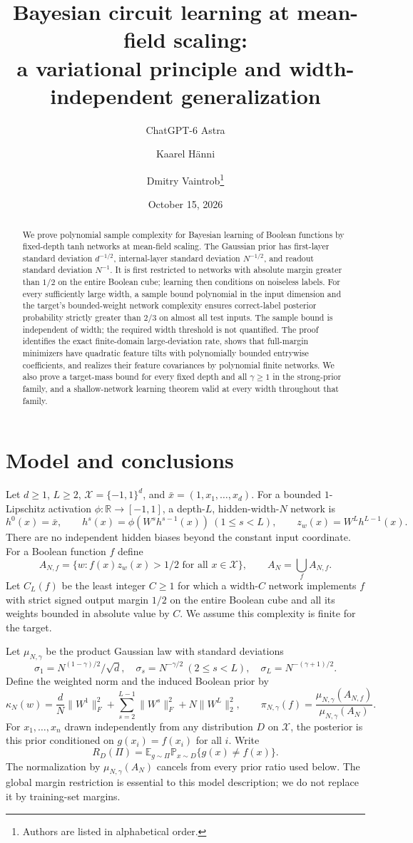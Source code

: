 \documentclass[11pt]{article}
\title{Bayesian circuit learning at mean-field scaling:\\a variational principle and width-independent generalization}
\author{ChatGPT-6 Astra \and Kaarel H\"anni \and Dmitry Vaintrob\thanks{Authors are listed in alphabetical order.}}
\date{October 15, 2026}
\theoremstyle{remark}\newtheorem{remark}[theorem]{Remark}
\newcommand{\E}{\mathbb E}\newcommand{\Prb}{\mathbb P}\newcommand{\R}{\mathbb R}
\begin{document}
\maketitle
\begin{abstract}
We prove polynomial sample complexity for Bayesian learning of Boolean functions
by fixed-depth tanh networks at mean-field scaling. The Gaussian prior has
first-layer standard deviation $d^{-1/2}$, internal-layer standard deviation
$N^{-1/2}$, and readout standard deviation $N^{-1}$. It is first restricted to
networks with absolute margin greater than $1/2$ on the entire Boolean cube;
learning then conditions on noiseless labels. For every sufficiently large
width, a sample bound polynomial in the input dimension and the target's
bounded-weight network complexity ensures correct-label posterior probability
strictly greater than $2/3$ on almost all test inputs. The sample bound is
independent of width; the required width threshold is not quantified.
The proof identifies the exact finite-domain large-deviation rate, shows that
full-margin minimizers have quadratic feature tilts with polynomially bounded
entrywise coefficients, and realizes their feature covariances by polynomial
finite networks. We also prove a target-mass bound for every fixed depth and
all $\gamma\geq1$ in the strong-prior family, and a shallow-network learning
theorem valid at every width throughout that family.
\end{abstract}

\section{Model and conclusions}
Let $d\geq1$, $L\geq2$, $\mathcal X=\{-1,1\}^d$, and
$\bar x=(1,x_1,\ldots,x_d)$. For a bounded $1$-Lipschitz activation
$\phi:\R\to[-1,1]$, a depth-$L$, hidden-width-$N$ network is
\[
 h^0(x)=\bar x,\qquad h^s(x)=\phi(W^s h^{s-1}(x))\ (1\leq s<L),
 \qquad z_w(x)=W^Lh^{L-1}(x).
\]
There are no independent hidden biases beyond the constant input coordinate.
For a Boolean function $f$ define
\[
 A_{N,f}=\{w:f(x)z_w(x)>1/2\text{ for all }x\in\mathcal X\},
 \qquad A_N=\bigcup_f A_{N,f}.
\]
Let $C_L(f)$ be the least integer $C\geq1$ for which a width-$C$ network
implements $f$ with strict signed output margin $1/2$ on the entire
Boolean cube and all its weights bounded in absolute value by $C$.
We assume this complexity is finite for the target.

Let $\mu_{N,\gamma}$ be the product Gaussian law with standard deviations
\[
 \sigma_1=N^{(1-\gamma)/2}/\sqrt d,\quad
 \sigma_s=N^{-\gamma/2}\ (2\leq s<L),\quad
 \sigma_L=N^{-(\gamma+1)/2}.
\]
Define the weighted norm and the induced Boolean prior by
\[
 \kappa_N(w)=\frac dN\|W^1\|_F^2+
 \sum_{s=2}^{L-1}\|W^s\|_F^2+N\|W^L\|_2^2,
 \qquad
 \pi_{N,\gamma}(f)=\frac{\mu_{N,\gamma}(A_{N,f})}{\mu_{N,\gamma}(A_N)}.
\]
For $x_1,\ldots,x_n$ drawn independently from any distribution $D$ on
$\mathcal X$, the posterior is this prior conditioned on
$g(x_i)=f(x_i)$ for all $i$. Write
\[
 R_D(\Pi)=\E_{g\sim\Pi}\Prb_{x\sim D}\{g(x)\ne f(x)\}.
\]
The normalization by $\mu_{N,\gamma}(A_N)$ cancels from every prior ratio used
below. The global margin restriction is essential to this model description;
we do not replace it by training-set margins.
\end{document}
